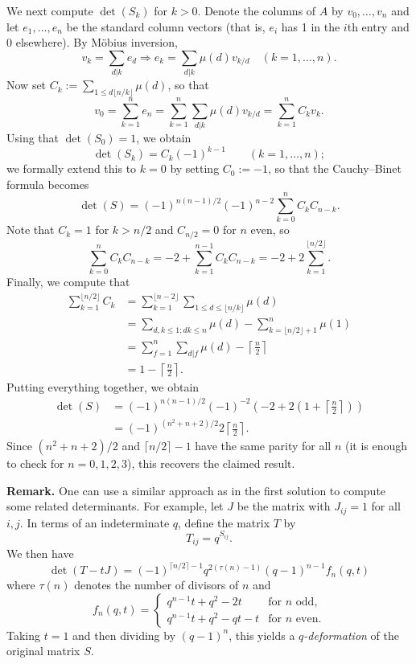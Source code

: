 \documentclass[amssymb,twocolumn,pra,10pt,aps]{revtex4-1}
\begin{document}
\begin{itemize}
We next compute $\det(S_k)$ for $k>0$.
Denote the columns of $A$ by $v_0,\dots,v_n$ and let $e_1,\dots,e_n$ be the standard column vectors (that is, $e_i$ has 1 in the $i$th entry and 0 elsewhere). By M\"obius inversion,
\[
v_k = \sum_{d|k} e_d \Longrightarrow e_k = \sum_{d|k} \mu(d) v_{k/d} \quad (k=1,\dots,n).
\]
Now set $C_k := \sum_{1 \leq d \lfloor n/k\rfloor} \mu(d)$, so that
\[
v_0 = \sum_{k=1}^n e_n = \sum_{k=1}^n \sum_{d|k} \mu(d) v_{k/d} = \sum_{k=1}^n C_k v_k.
\]
Using that $\det(S_0) = 1$, we obtain 
\[
\det(S_k) = C_k (-1)^{k-1} \qquad (k=1,\dots,n);
\]
we formally extend this to $k=0$ by setting $C_0 := -1$, so that the Cauchy--Binet formula becomes
\[
\det(S) = (-1)^{n(n-1)/2} (-1)^{n-2} \sum_{k=0}^n C_k C_{n-k}.
\]
Note that $C_k = 1$ for $k > n/2$ and $C_{n/2} = 0$ for $n$ even, so
\[
\sum_{k=0}^n C_k C_{n-k} = -2 + \sum_{k=1}^{n-1} C_k C_{n-k}
= -2 + 2 \sum_{k=1}^{\lfloor n/2 \rfloor}.
\]
Finally, we compute that
\begin{align*}
\sum_{k=1}^{\lfloor n/2 \rfloor} C_k &= \sum_{k=1}^{\lfloor n-2\rfloor} \sum_{1 \leq d \leq \lfloor n/k \rfloor} \mu(d) \\
&= \sum_{d,k\leq 1; dk \leq n} \mu(d) - \sum_{k=\lfloor n/2\rfloor+1}^n \mu(1) \\
&= \sum_{f=1}^n \sum_{d|f} \mu(d) - \left\lceil \frac{n}{2} \right\rceil \\
&= 1 - \left\lceil \frac{n}{2} \right\rceil.
\end{align*}
Putting everything together, we obtain
\begin{align*}
\det(S) &= (-1)^{n(n-1)/2} (-1)^{-2} \left(-2 + 2\left(1 + \left\lceil \frac{n}{2} \right\rceil \right) \right) \\
&= (-1)^{(n^2+n+2)/2} 2 \left\lceil \frac{n}{2} \right\rceil.
\end{align*}
Since $(n^2+n+2)/2$ and $\lceil n/2 \rceil - 1$ have the same parity for all $n$ (it is enough to check for $n=0,1,2,3$), this recovers the claimed result.

\noindent
\textbf{Remark.}
One can use a similar approach as in the first solution to compute some related determinants.
For example, let $J$ be the matrix with $J_{ij} = 1$ for all $i,j$.
In terms of an indeterminate $q$, define the matrix $T$ by 
\[
T_{ij} = q^{S_{ij}}.
\]
We then have
\[
\det(T-tJ) = (-1)^{\lceil n/2 \rceil-1} q^{2(\tau(n)-1)} (q-1)^{n-1}f_n(q,t)
\]
where $\tau(n)$ denotes the number of divisors of $n$
and
\[
f_n(q,t) = \begin{cases} q^{n-1}t+q^2-2t & \mbox{for $n$ odd,} \\q^{n-1}t +q^2-qt-t & \mbox{for $n$ even.}
\end{cases}
\]
Taking $t=1$ and then dividing by $(q-1)^n$, this yields a \emph{$q$-deformation} of the original matrix $S$.

\end{itemize}
\end{document}
